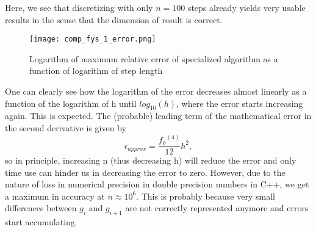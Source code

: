 \documentclass[10pt,a4paper]{article}
\begin{document}
Here, we see that discretizing with only $n=100$ steps already yields very usable results in the sense that the dimension of result is correct.
\begin{figure}[H]
	\texttt{[image: comp\_fys\_1\_error.png]}
	\caption[Relative error of specialized algorithm]{Logarithm of maximum relative error of specialized algorithm as a function of logarithm of step length}
	\label{Figure 3}
\end{figure}
One can clearly see how the logarithm of the error decreases almost linearly as a function of the logarithm of h until $log_{10}(h)$, where the error starts increasing again. This is expected. The (probable) leading term of the mathematical error in the second derivative is given by $$\epsilon_{approx}=\frac{{f_0}^{(4)}}{12}h^2,$$ so in principle, increasing n (thus decreasing h) will reduce the error and only time use can hinder us in decreasing the error to zero. However, due to the nature of loss in numerical precision in double precision numbers in C++, we get a maximum in accuracy at $n \approx 10^6$.  This is probably because very small differences between $g_i$ and $g_{i+1}$
 are not correctly represented anymore and errors start accumulating.
\end{document}

